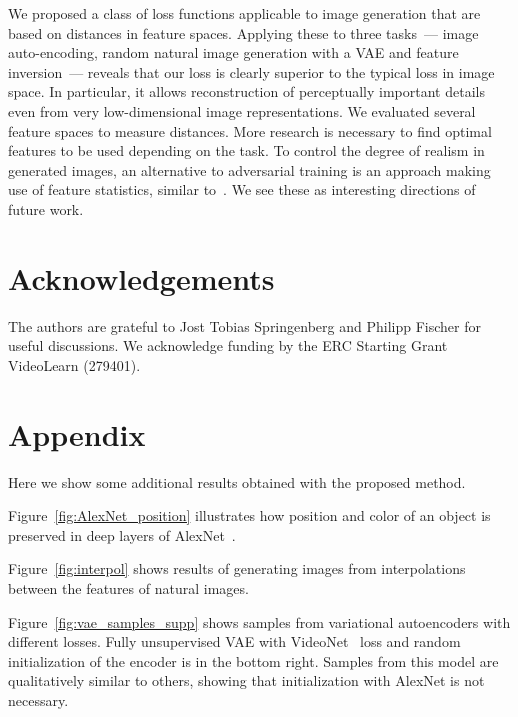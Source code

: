 \documentclass{article}
\begin{document}
We proposed a class of loss functions applicable to image generation that are based on distances in feature spaces.
Applying these to three tasks~--- image auto-encoding, random natural image generation with a VAE and feature inversion~--- reveals that our loss is clearly superior to the typical loss in image space.
In particular, it allows reconstruction of perceptually important details even from very low-dimensional image representations.
We evaluated several feature spaces to measure distances.
More research is necessary to find optimal features to be used depending on the task.
To control the degree of realism in generated images, an alternative to adversarial training is an approach making use of feature statistics, similar to~\citet{Gatys_arxiv2015}. 
We see these as interesting directions of future work.

\section*{Acknowledgements}
The authors are grateful to Jost Tobias Springenberg and Philipp Fischer for useful discussions.
We acknowledge funding by the ERC Starting Grant VideoLearn (279401).






\section*{Appendix}


Here we show some additional results obtained with the proposed method.

Figure~\ref{fig:AlexNet_position} illustrates how position and color of an object is preserved in deep layers of AlexNet~\citep{Krizhevsky_NIPS2012}.

Figure~\ref{fig:interpol} shows results of generating images from interpolations between the features of natural images.

Figure~\ref{fig:vae_samples_supp} shows samples from variational autoencoders with different losses.
Fully unsupervised VAE with VideoNet~\citep{Wang_ICCV2015} loss and random initialization of the encoder is in the bottom right.
Samples from this model are qualitatively similar to others, showing that initialization with AlexNet is not necessary.
\end{document}
